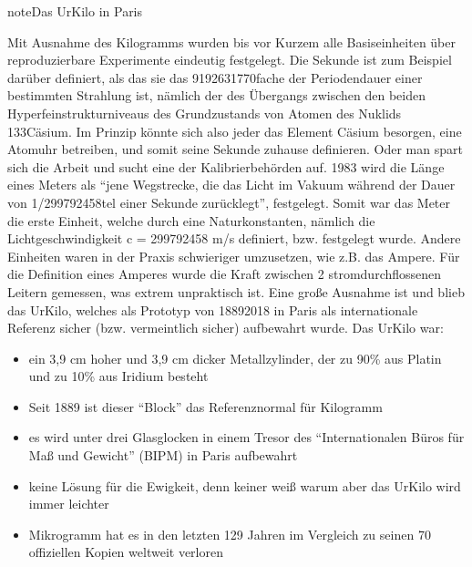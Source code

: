 \documentclass[letterpaper,10pt,english]{jupyterBook}
\begin{document}
\begin{sphinxadmonition}{note}{Das Ur\sphinxhyphen{}Kilo in Paris}

\sphinxAtStartPar
Mit Ausnahme des Kilogramms wurden bis vor Kurzem alle Basiseinheiten über reproduzierbare Experimente eindeutig festgelegt. Die Sekunde ist zum Beispiel darüber definiert, als das sie das 9192631770\sphinxhyphen{}fache der Periodendauer einer bestimmten Strahlung ist, nämlich der des Übergangs zwischen den beiden Hyperfeinstrukturniveaus des Grundzustands von Atomen des Nuklids 133\sphinxhyphen{}Cäsium. Im Prinzip könnte sich also jeder das Element Cäsium besorgen, eine Atomuhr betreiben, und somit seine Sekunde zuhause definieren. Oder man spart sich die Arbeit und sucht eine der Kalibrierbehörden auf.
1983 wird die Länge eines Meters als “jene Wegstrecke, die das Licht im Vakuum während der Dauer von 1/299792458\sphinxhyphen{}tel einer Sekunde zurücklegt”, festgelegt. Somit war das Meter die erste Einheit, welche durch eine Naturkonstanten, nämlich die Lichtgeschwindigkeit c = 299792458 m/s definiert, bzw. festgelegt wurde. Andere Einheiten waren in der Praxis schwieriger umzusetzen, wie z.B. das Ampere. Für die Definition eines Amperes wurde die Kraft zwischen 2 stromdurchflossenen Leitern gemessen, was extrem unpraktisch ist.
Eine große Ausnahme ist und blieb das Ur\sphinxhyphen{}Kilo, welches als Prototyp von 1889\sphinxhyphen{}2018 in Paris als internationale Referenz sicher (bzw. vermeintlich sicher) aufbewahrt wurde. Das Ur\sphinxhyphen{}Kilo war:
\begin{itemize}
\item {} 
\sphinxAtStartPar
ein 3,9 cm hoher und 3,9 cm dicker Metallzylinder, der zu 90\% aus Platin und zu 10\% aus Iridium besteht

\item {} 
\sphinxAtStartPar
Seit 1889 ist dieser “Block” das Referenznormal für Kilogramm

\item {} 
\sphinxAtStartPar
es wird unter drei Glasglocken in einem Tresor des “Internationalen Büros für Maß und Gewicht” (BIPM) in Paris aufbewahrt

\item {} 
\sphinxAtStartPar
keine Lösung für die Ewigkeit, denn \sphinxhyphen{} keiner weiß warum \sphinxhyphen{} aber das Ur\sphinxhyphen{}Kilo wird immer leichter

\item {} 
 Mikrogramm hat es in den letzten 129 Jahren im Vergleich zu seinen 70 offiziellen Kopien weltweit verloren


\end{itemize}
\end{sphinxadmonition}
\end{document}
